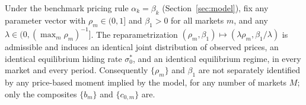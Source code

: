 \label{prop:scale_nonid}
Under the benchmark pricing rule $\alpha_k=\beta_k$ (Section~\ref{sec:model}), fix any
parameter vector with $\rho_m\in(0,1]$ and $\beta_1>0$ for all markets $m$, and any
$\lambda\in(0,(\max_m\rho_m)^{-1}]$. The reparametrization $(\rho_m,\beta_1)\mapsto
(\lambda\rho_m,\beta_1/\lambda)$ is admissible and induces an identical joint distribution of
observed prices, an identical equilibrium hiding rate $\sigma_0^*$, and an identical
equilibrium regime, in every market and every period. Consequently $\{\rho_m\}$ and $\beta_1$
are not separately identified by any price-based moment implied by the model, for any number of
markets $M$; only the composites $\{b_m\}$ and $\{c_{0,m}\}$ are.

